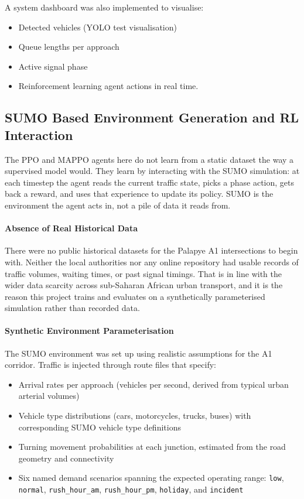﻿\documentclass[11pt, a4paper]{report}
\begin{document}
A system dashboard was also implemented to visualise:

\begin{itemize}
    \item Detected vehicles (YOLO test visualisation)
    \item Queue lengths per approach
    \item Active signal phase
    \item Reinforcement learning agent actions in real time.
\end{itemize}
\subsection{SUMO Based Environment Generation and RL Interaction}

The PPO and MAPPO agents here do not learn from a static dataset the way a supervised model would. They learn by interacting with the SUMO simulation: at each timestep the agent reads the current traffic state, picks a phase action, gets back a reward, and uses that experience to update its policy. SUMO is the environment the agent acts in, not a pile of data it reads from.

\paragraph{Absence of Real Historical Data}

There were no public historical datasets for the Palapye A1 intersections to begin with. Neither the local authorities nor any online repository had usable records of traffic volumes, waiting times, or past signal timings. That is in line with the wider data scarcity across sub-Saharan African urban transport, and it is the reason this project trains and evaluates on a synthetically parameterised simulation rather than recorded data.

\paragraph{Synthetic Environment Parameterisation}

The SUMO environment was set up using realistic assumptions for the A1 corridor. Traffic is injected through route files that specify:

\begin{itemize}
    \item Arrival rates per approach (vehicles per second, derived from typical urban arterial volumes)
    \item Vehicle type distributions (cars, motorcycles, trucks, buses) with corresponding SUMO vehicle type definitions
    \item Turning movement probabilities at each junction, estimated from the road geometry and connectivity
    \item Six named demand scenarios spanning the expected operating range: \texttt{low}, \texttt{normal}, \texttt{rush\_hour\_am}, \texttt{rush\_hour\_pm}, \texttt{holiday}, and \texttt{incident}
\end{itemize}
\end{document}
